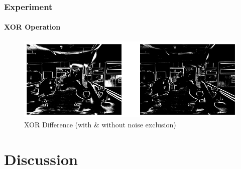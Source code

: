 \documentclass[
	11pt, %
	aspectratio=169, %
]{beamer}
\begin{document}
\begin{frame}
	\frametitle{Experiment}
	\framesubtitle{XOR Operation}

	\begin{figure}
		\includegraphics[width=\linewidth]{./Images/mtb_diff.png}
		\caption{XOR Difference (with \& without noise exclusion)}
	\end{figure}
\end{frame}

\section{Discussion}
\end{document}
